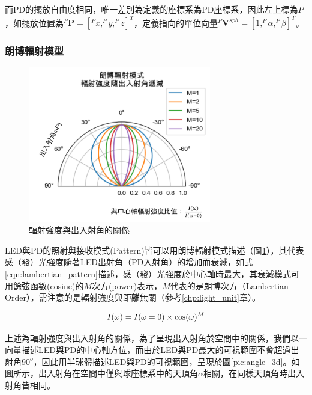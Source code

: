        而PD的擺放自由度相同，唯一差別為定義的座標系為PD座標系，因此左上標為$P$，如擺放位置為$^P \boldsymbol{P}=[^Px,^Py,^Pz]^T$，定義指向的單位向量$^P\boldsymbol{V}^{sph}=[1,^P\alpha,^P\beta]^T$。
        




        \subsubsection{朗博輻射模型}
        \label{chp:lambertian}

        \begin{figure}[h]
            \centering
            \includegraphics[width=8cm]{ch2pic/lambertian.png}
            \caption{輻射強度與出入射角的關係}
            \label{pic:lambertian}
        \end{figure}

        LED與PD的照射與接收模式(Pattern)皆可以用朗博輻射模式描述（圖\ref{pic:lambertian}），其代表感（發）光強度隨著LED出射角（PD入射角）的增加而衰減，如式\ref{eqn:lambertian_pattern}描述，感（發）光強度於中心軸時最大，其衰減模式可用餘弦函數(cosine)的$M$次方(power)表示，$M$代表的是朗博次方（Lambertian Order），需注意的是輻射強度與距離無關（參考\ref{chp:light_unit}章）。

        \begin{equation}
            \label{eqn:lambertian_pattern}
            I(\omega)=I(\omega=0)\times\cos(\omega)^{M}\\
        \end{equation}

     
        上述為輻射強度與出入射角的關係，為了呈現出入射角於空間中的關係，我們以一向量描述LED與PD的中心軸方位，而由於LED與PD最大的可視範圍不會超過出射角$90^{o}$，因此用半球體描述LED與PD的可視範圍，呈現於圖\ref{pic:angle_3d}。如圖所示，出入射角在空間中僅與球座標系中的天頂角$\alpha$相關，在同樣天頂角時出入射角皆相同。


